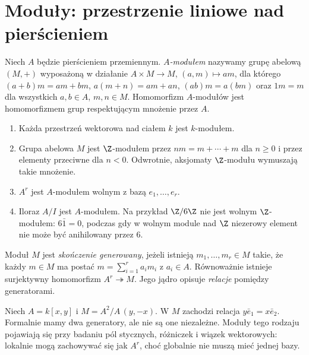 \section{Moduły: przestrzenie liniowe nad pierścieniem}
\label{sec:moduly}

\begin{definicja}[Moduł]
Niech $A$ będzie pierścieniem przemiennym. \emph{$A$-modułem}
nazywamy grupę abelową $(M,+)$ wyposażoną w działanie
$A\times M\to M$, $(a,m)\mapsto am$, dla którego
$(a+b)m=am+bm$, $a(m+n)=am+an$,
$(ab)m=a(bm)$ oraz $1m=m$ dla wszystkich
$a,b\in A$, $m,n\in M$. Homomorfizm $A$-modułów
jest homomorfizmem grup respektującym mnożenie przez $A$.
\end{definicja}

\begin{przyklad}
\begin{enumerate}[label=\alph*)]
\item Każda przestrzeń wektorowa nad ciałem $k$ jest $k$-modułem.
\item Grupa abelowa $M$ jest $\Z$-modułem przez
$nm=m+\cdots+m$ dla $n\ge0$ i przez elementy przeciwne
dla $n<0$. Odwrotnie, aksjomaty $\Z$-modułu wymuszają
takie mnożenie.
\item $A^r$ jest $A$-modułem wolnym z bazą $e_1,\ldots,e_r$.
\item Iloraz $A/I$ jest $A$-modułem. Na przykład
$\Z/6\Z$ nie jest wolnym $\Z$-modułem: $6\bar1=0$,
podczas gdy w wolnym module nad $\Z$ niezerowy element
nie może być anihilowany przez $6$.
\end{enumerate}
\end{przyklad}

\begin{definicja}
Moduł $M$ jest \emph{skończenie generowany}, jeżeli istnieją
$m_1,\ldots,m_r\in M$ takie, że każdy $m\in M$ ma postać
$m=\sum_{i=1}^r a_i m_i$ z $a_i\in A$.
Równoważnie istnieje surjektywny homomorfizm
$A^r\twoheadrightarrow M$. Jego jądro opisuje
\emph{relacje} pomiędzy generatorami.
\end{definicja}

\begin{przyklad}
Niech $A=k[x,y]$ i $M=A^2/A\,(y,-x)$.
W $M$ zachodzi relacja $y\bar e_1=x\bar e_2$.
Formalnie mamy dwa generatory, ale nie są one niezależne.
Moduły tego rodzaju pojawiają się przy badaniu pól
stycznych, różniczek i wiązek wektorowych: lokalnie
mogą zachowywać się jak $A^r$, choć globalnie
nie muszą mieć jednej bazy.
\end{przyklad}

